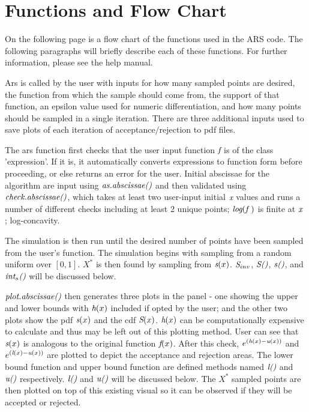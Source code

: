\documentclass{article}\usepackage[]{graphicx}\usepackage[]{color}
\begin{document}
\section{Functions and Flow Chart}

On the following page is a flow chart of the functions used in the ARS code.  The following paragraphs will briefly describe each of these functions.  For further information, please see the help manual. 

Ars is called by the user with inputs for how many sampled points are desired, the function from which the sample should come from, the support of that function, an epsilon value used for numeric differentiation, and how many points should be sampled in a single iteration.  There are three additional inputs used to save plots of each iteration of acceptance$/$rejection to pdf files.  

The ars function first checks that the user input function $\emph{f}$ is of the class 'expression'.  If it is, it automatically converts expressions to function form before proceeding, or else returns an error for the user.  Initial abscissae for the algorithm are input using $\emph{as.abscissae()}$ and then validated using $\emph{check.abscissae()}$, which takes at least two user-input initial $\emph{x}$ values and runs a number of different checks including at least 2 unique points; $\emph{log}(\emph{f })$ is finite at $\emph{x }$; log-concavity. 

The simulation is then run until the desired number of points have been sampled from the user's function.  The simulation begins with sampling from a random uniform over $[0, 1]$.  $X^*$ is then found by sampling from $\emph{s}(x)$. $\emph{S}_{inv}$, $\emph{S}\emph{()}$, $\emph{s}\emph{()}$, and $\emph{int}_{s}\emph{()}$ will be discussed below.

$\emph{plot.abscissae()}$ then generates three plots in the panel - one showing the upper and lower bounds with $\emph{h}(x)$ included if opted by the user; and the other two plots show the pdf $\emph{s}(x)$ and the cdf $\emph{S}(x)$.  $\emph{h}(x)$ can be computationally expensive to calculate and thus may be left out of this plotting method.  User can see that $\emph{s}(x)$ is analogous to the original function $\emph{f}(x)$.  After this check, $e^{( \emph{h}(x) - \emph{u}(x) )}$ and $e^{( \emph{l}(x) - \emph{u}(x) )}$ are plotted to depict the acceptance and rejection areas.  The lower bound function and upper bound function are defined methods named $\emph{l()}$ and $\emph{u()}$ respectively. $\emph{l()}$ and $\emph{u()}$ will be discussed below.  The $X^{*}$ sampled points are then plotted on top of this existing visual so it can be observed if they will be accepted or rejected.
\end{document}

